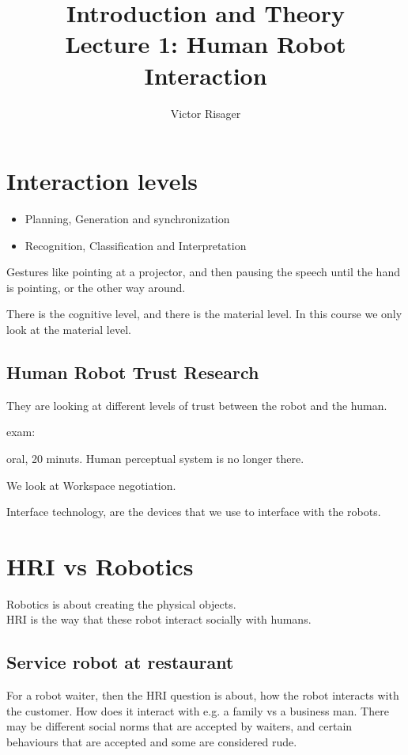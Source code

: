 \documentclass[a4paper]{article}
\title{Introduction and Theory\\
	\large Lecture 1: Human Robot Interaction}
\author{Victor Risager}
\begin{document}
\maketitle

\section{Interaction levels}
\begin{itemize}
	\item Planning, Generation and synchronization
	\item Recognition, Classification and Interpretation
\end{itemize}

Gestures like pointing at a projector, and then pausing the speech until the hand is pointing, or the other way around. 

There is the cognitive level, and there is the material level. In this course we only look at the material level.

\subsection{Human Robot Trust Research}
They are looking at different levels of trust between the robot and the human. 


exam:

oral, 20 minuts.
Human perceptual system is no longer there.


We look at Workspace negotiation. 

Interface technology, are the devices that we use to interface with the robots. 

\section{HRI vs Robotics}
Robotics is about creating the physical objects.\\
HRI is the way that these robot interact socially with humans. 

\subsection{Service robot at restaurant}

For a robot waiter, then the HRI question is about, how the robot interacts with the customer. How does it interact with e.g. a family vs a business man. There may be different social norms that are accepted by waiters, and certain behaviours that are accepted and some are considered rude. 
\end{document}
